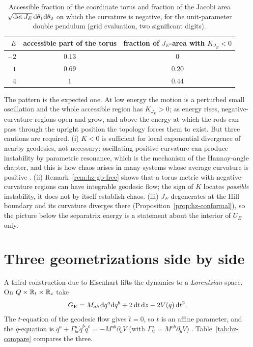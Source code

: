 \begin{table}[t]
\centering
\begin{tabular}{@{}rcc@{}}
\toprule
$E$ & accessible part of the torus & fraction of $J_E$-area with $K_{J_E}<0$\\
\midrule
$-2$ & $0.13$ & $0$\\
$1$  & $0.69$ & $0.20$\\
$4$  & $1$    & $0.44$\\
\bottomrule
\end{tabular}
\caption{Accessible fraction of the coordinate torus and fraction of the Jacobi area
$\sqrt{\det J_E}\,\mathrm{d}\theta_1\mathrm{d}\theta_2$ on which the curvature is negative, for the
unit-parameter double pendulum (grid evaluation, two significant digits).}
\label{tab:hz-curv}
\end{table}

\begin{remark}\label{rem:hz-caveat}
The pattern is the expected one. At low energy the motion is a perturbed
small oscillation and the whole accessible region has $K_{J_E}>0$; as energy
rises, negative-curvature regions open and grow, and above the energy at which
the rods can pass through the upright position the topology forces them to exist.
But three cautions are required.
(i) $K<0$ is sufficient for local exponential divergence of nearby geodesics, not necessary:
oscillating positive curvature can produce instability by parametric resonance, which is the
mechanism of the Hannay-angle chapter, and this is how chaos arises in many
systems whose average curvature is positive \cite{hdp:casetti1996,hdp:pettini2007}.
(ii) Remark~\ref{rem:hz-gb-free} shows that a torus metric with negative-curvature regions can
have integrable geodesic flow; the sign of $K$ locates \emph{possible} instability,
it does not by itself establish chaos.
(iii) $J_E$ degenerates at the Hill boundary and its curvature diverges there
(Proposition~\ref{prop:hz-conformal}), so the picture below the separatrix energy is a statement
about the interior of $U_E$ only.
\end{remark}

\section{Three geometrizations side by side}
\label{sec:hz-compare}

A third construction due to Eisenhart lifts the dynamics to a \emph{Lorentzian}
space. On $Q\times\mathbb{R}_t\times\mathbb{R}_z$ take
\begin{equation}\label{eq:hz-eisenhart}
  G_{\rm E}=M_{ab}\,\mathrm{d} q^a\mathrm{d} q^b+2\,\mathrm{d} t\,\mathrm{d} z-2V(q)\,\mathrm{d} t^2 .
\end{equation}
The $t$-equation of the geodesic flow gives $\ddot t=0$, so $t$ is an affine
parameter, and the $q$-equation is $\ddot q^a+\Gamma^a_{bc}\dot q^b\dot q^c=-M^{ab}\partial_bV$ (with
$\Gamma^a_{tt}=M^{ab}\partial_bV$) \cite{hdp:eisenhart1929}. Table~\ref{tab:hz-compare} compares the three.

